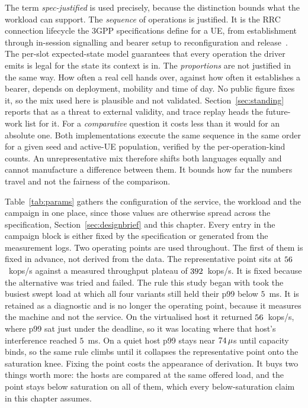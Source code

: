 \documentclass[english,oneside,a4paper,censored,csm,software-track-2020]{HYthesisML}
\begin{document}
The term \emph{spec-justified} is used precisely, because the distinction bounds what the
workload can support. The \emph{sequence} of operations is justified. It is the RRC connection
lifecycle the 3GPP specifications define for a UE, from establishment through in-session
signalling and bearer setup to reconfiguration and release~\cite{3gpp38401,3gpp38331}. The
per-slot expected-state model guarantees that every operation the driver emits is legal for the
state its context is in. The \emph{proportions} are not justified in the same way. How often a
real cell hands over, against how often it establishes a bearer, depends on deployment, mobility
and time of day. No public figure fixes it, so the mix used here is plausible and not
validated. Section~\ref{sec:standing} reports that as a threat to external validity, and trace
replay heads the future-work list for it. For a \emph{comparative} question it costs less than it
would for an absolute one. Both implementations execute the same sequence in the same order for a
given seed and active-UE population, verified by the per-operation-kind counts. An
unrepresentative mix therefore shifts both languages equally and cannot manufacture a difference
between them. It bounds how far the numbers travel and not the fairness of the comparison.

Table~\ref{tab:params} gathers the configuration of the service, the workload and the campaign in
one place, since those values are otherwise spread across the specification,
Section~\ref{sec:designbrief} and this chapter. Every entry in the campaign block is either fixed
by the specification or generated from the measurement logs. Two operating points are used
throughout. The first of them is fixed in advance, not derived from the data. The
representative point sits at $56$~kops/s against a measured throughput plateau of
$392$~kops/s. It is fixed because the alternative was tried and failed. The rule this study
began with took the busiest swept load at which all four variants still held their p99 below
$5$~ms. It is retained as a diagnostic and is no longer the operating point, because it measures
the machine and not the service. On the virtualised host it returned $56$~kops/s,
where p99 sat just under the deadline, so it was locating where that host's interference reached
$5$~ms. On a quiet host p99 stays near $74\,\mu$s until capacity binds, so the
same rule climbs until it collapses the representative point onto the saturation knee. Fixing
the point costs the appearance of derivation. It buys two things worth more: the hosts are
compared at the same offered load, and the point stays below saturation on all of them, which
every below-saturation claim in this chapter assumes.
\end{document}
